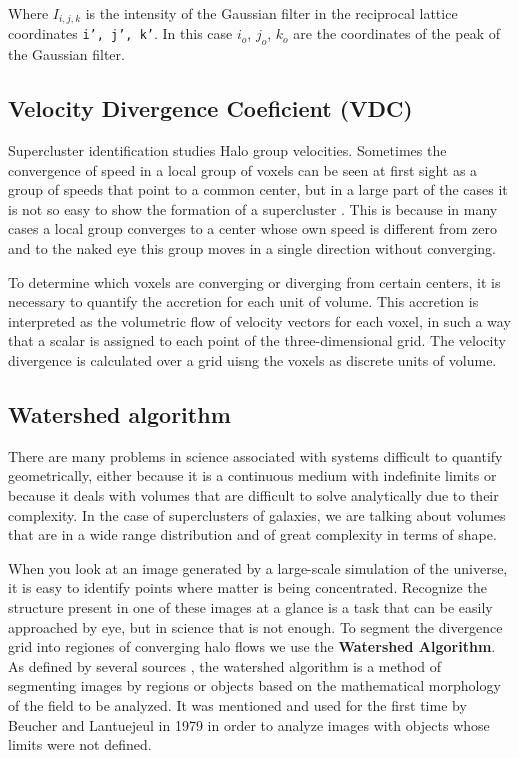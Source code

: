 \documentclass[a4paper,fleqn,usenatbib]{mnras}
\begin{document}
Where $I_{i,j,k}$ is the intensity of the Gaussian filter in the reciprocal lattice coordinates \texttt{i', j', k'}. In this case $i_o$, $j_o$, $k_o$ are the coordinates of the peak of the Gaussian filter.
 





\subsection{Velocity Divergence Coeficient (VDC)}
\label{sec:INTROVDC}
Supercluster identification studies Halo group velocities. Sometimes the convergence of speed in a local group of voxels can be seen at first sight as a group of speeds that point to a common center, but in a large part of the cases it is not so easy to show the formation of a supercluster . This is because in many cases a local group converges to a center whose own speed is different from zero and to the naked eye this group moves in a single direction without converging.

To determine which voxels are converging or diverging from certain centers, it is necessary to quantify the accretion for each unit of volume. This accretion is interpreted as the volumetric flow of velocity vectors for each voxel, in such a way that a scalar is assigned to each point of the three-dimensional grid.
The velocity divergence is calculated over a grid uisng the voxels as discrete units of volume.


\subsection{Watershed algorithm}
\label{sec:INTROWatershed}
 There are many problems in science associated with systems difficult to quantify geometrically, either because it is a continuous medium with indefinite limits or because it deals with volumes that are difficult to solve analytically due to their complexity. In the case of superclusters of galaxies, we are talking about volumes that are in a wide range distribution and of great complexity in terms of shape. 

 When you look at an image generated by a large-scale simulation of the universe, it is easy to identify points where matter is being concentrated. Recognize the structure present in one of these images at a glance is a task that can be easily approached by eye, but in science that is not enough.
To segment the divergence grid into regiones of converging halo flows we use the \textbf{Watershed Algorithm}.
As defined by several sources \cite{DelaunayTessellations_Schaap} \cite{BeucherSegmetation}, the watershed algorithm is a method of segmenting images by regions or objects based on the mathematical morphology of the field to be analyzed. It was mentioned and used for the first time by Beucher and Lantuejeul\cite{BeucherWatershed1979} in 1979 in order to analyze images with objects whose limits were not defined.
\end{document}
